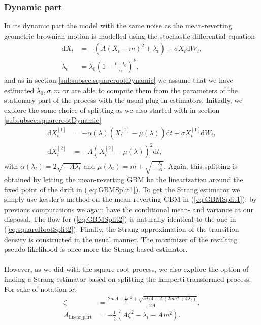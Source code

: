 \subsubsection{Dynamic part}\label{subsubsec:meanrevertingGBMDynamic}
In its dynamic part the model with the same noise as the mean-reverting geometric brownian motion is modelled using the stochastic differential equation
\begin{align}
    \mathrm{d}X_t &= -\left(A\left(X_t - m\right)^2 + \lambda_t\right) + \sigma X_t \mathrm{d}W_t, \label{eq:GBM_dynamic_SDE}\\
    \lambda_t &= \lambda_0\left(1 - \frac{t - t_0}{\tau_c}\right)^\nu,
\end{align}
and as in section \ref{subsubsec:squarerootDynamic} we assume that we have estimated $\lambda_0, \sigma, m$ or are able to compute them from the parameters of the stationary part of the process with the usual plug-in estimators. Initially, we explore the same choice of splitting as we also started with in section \ref{subsubsec:squarerootDynamic}
\begin{align}
    \mathrm{d}X_t^{[1]} &= -\alpha(\lambda)\left(X_t^{[1]} - \mu(\lambda)\right)  \mathrm{d}t + \sigma X_t^{[1]} \mathrm{d}W_t, \label{eq:GBMSplit1} \\
    \mathrm{d}X_t^{[2]} &= - A \left(X_t^{[2]} - \mu(\lambda)\right)^2 \mathrm{d}t, \label{eq:GBMSplit2}
\end{align}
with $\alpha(\lambda_t) = 2\sqrt{-A\lambda_t}$ and $\mu(\lambda_t) = m + \sqrt{-\frac{\lambda_t}{A}}$.
Again, this splitting is obtained by letting the mean-reverting GBM be the linearization around the fixed point of the drift in (\ref{eq:GBMSplit1}). To get the Strang estimator we simply use kessler's method on the mean-reverting GBM in (\ref{eq:GBMSplit1}); by previous computations we again have the conditional mean- and variance at our disposal. The flow for (\ref{eq:GBMSplit2}) is naturally identical to the one in (\ref{eq:squareRootSplit2}). Finally, the Strang approximation of the transition density is constructed in the usual manner. The maximizer of the resulting pseudo-likelihood is once more the Strang-based estimator.\\\\
However, as we did with the square-root process, we also explore the option of finding a Strang estimator based on splitting the lamperti-transformed process. For sake of notation let
\begin{align}
    \zeta &= \frac{2mA - \frac{1}{2}\sigma^2 + \sqrt{\sigma^4/4 - A\left(2m\sigma^2 + 4\lambda_t\right)}}{2A},\\
    A_{\mathrm{linear\_part}} &= - \frac{1}{\zeta}\left(A \zeta^2 - \lambda_t - Am^2\right).
\end{align}

